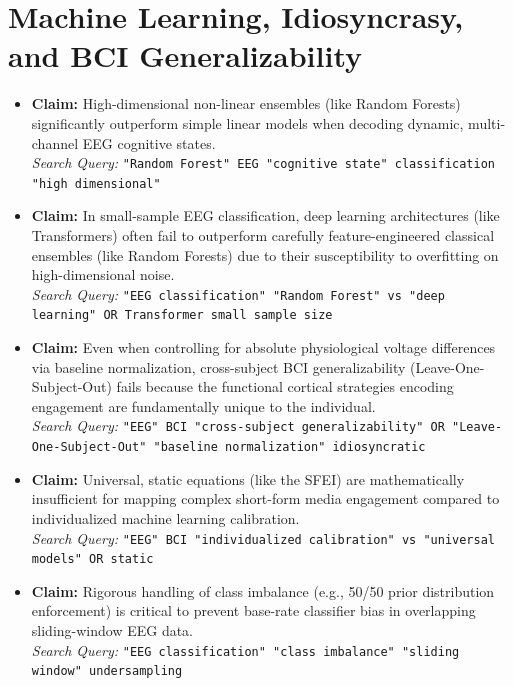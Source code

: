 \documentclass[12pt,a4paper]{report}
\begin{document}
\section{Machine Learning, Idiosyncrasy, and BCI Generalizability}
\begin{itemize}
    \item \textbf{Claim:} High-dimensional non-linear ensembles (like Random Forests) significantly outperform simple linear models when decoding dynamic, multi-channel EEG cognitive states.\\
    \textit{Search Query:} \texttt{"Random Forest" EEG "cognitive state" classification "high dimensional"}
    
    \item \textbf{Claim:} In small-sample EEG classification, deep learning architectures (like Transformers) often fail to outperform carefully feature-engineered classical ensembles (like Random Forests) due to their susceptibility to overfitting on high-dimensional noise.\\
    \textit{Search Query:} \texttt{"EEG classification" "Random Forest" vs "deep learning" OR Transformer small sample size}
    
    \item \textbf{Claim:} Even when controlling for absolute physiological voltage differences via baseline normalization, cross-subject BCI generalizability (Leave-One-Subject-Out) fails because the functional cortical strategies encoding engagement are fundamentally unique to the individual.\\
    \textit{Search Query:} \texttt{"EEG" BCI "cross-subject generalizability" OR "Leave-One-Subject-Out" "baseline normalization" idiosyncratic}
    
    \item \textbf{Claim:} Universal, static equations (like the SFEI) are mathematically insufficient for mapping complex short-form media engagement compared to individualized machine learning calibration.\\
    \textit{Search Query:} \texttt{"EEG" BCI "individualized calibration" vs "universal models" OR static}
    
    \item \textbf{Claim:} Rigorous handling of class imbalance (e.g., 50/50 prior distribution enforcement) is critical to prevent base-rate classifier bias in overlapping sliding-window EEG data.\\
    \textit{Search Query:} \texttt{"EEG classification" "class imbalance" "sliding window" undersampling}
\end{itemize}
\end{document}
